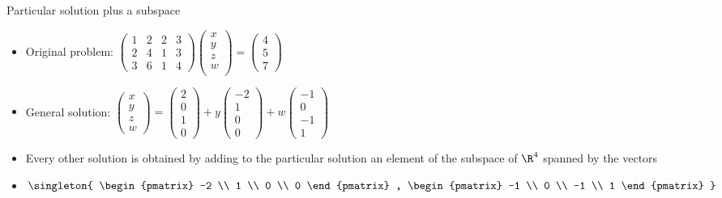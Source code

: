 \documentclass{beamer}
\begin{document}
\begin{frame}{Particular solution plus a subspace}

\begin{itemize}
\item
Original problem: $
\begin{pmatrix}
1 & 2 & 2 & 3 \\
2 & 4 & 1 & 3 \\
3 & 6 & 1 & 4
\end{pmatrix}
\begin{pmatrix}
x \\
y \\
z \\
w \\
\end{pmatrix}
=
\begin{pmatrix}
4 \\
5 \\
7
\end{pmatrix}
$
\item
General solution: $
\begin{pmatrix}
x \\ y \\ z \\ w
\end{pmatrix}
=
\begin{pmatrix}
2 \\
0 \\
1 \\
0
\end{pmatrix}
+
y
\begin{pmatrix}
-2 \\
1 \\
0 \\
0
\end{pmatrix}
+
w
\begin{pmatrix}
-1 \\
0 \\
-1 \\
1
\end{pmatrix}
$
\item Every other solution is obtained by adding to the particular solution an element of the subspace of $\R^4$ spanned by the vectors
\item
$
\singleton{
\begin{pmatrix}
-2 \\
1 \\
0 \\
0
\end{pmatrix}
,
\begin{pmatrix}
-1 \\
0 \\
-1 \\
1
\end{pmatrix}
}
$

\end{itemize}
\end{frame}
\end{document}
